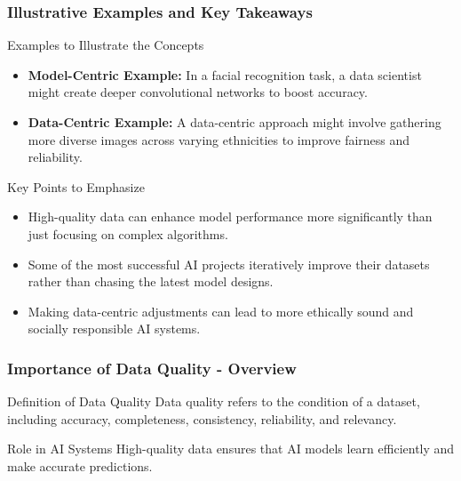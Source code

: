 \documentclass[aspectratio=169]{beamer}
\begin{document}
\begin{frame}[fragile]
    \frametitle{Illustrative Examples and Key Takeaways}
    \begin{block}{Examples to Illustrate the Concepts}
        \begin{itemize}
            \item \textbf{Model-Centric Example:} In a facial recognition task, a data scientist might create deeper convolutional networks to boost accuracy.
            \item \textbf{Data-Centric Example:} A data-centric approach might involve gathering more diverse images across varying ethnicities to improve fairness and reliability.
        \end{itemize}
    \end{block}

    \begin{block}{Key Points to Emphasize}
        \begin{itemize}
            \item High-quality data can enhance model performance more significantly than just focusing on complex algorithms.
            \item Some of the most successful AI projects iteratively improve their datasets rather than chasing the latest model designs.
            \item Making data-centric adjustments can lead to more ethically sound and socially responsible AI systems.
        \end{itemize}
    \end{block}
\end{frame}

\begin{frame}[fragile]
    \frametitle{Importance of Data Quality - Overview}
    \begin{block}{Definition of Data Quality}
        Data quality refers to the condition of a dataset, including accuracy, completeness, consistency, reliability, and relevancy. 
    \end{block}
    \begin{block}{Role in AI Systems}
        High-quality data ensures that AI models learn efficiently and make accurate predictions. 
    \end{block}
\end{frame}
\end{document}
